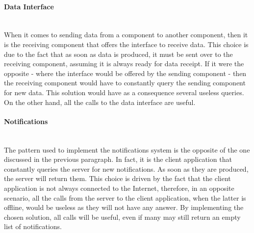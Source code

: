 \documentclass[../../DD.tex]{subfiles}
\begin{document}
	\paragraph{Data Interface}\mbox{}\\
	When it comes to sending data from a component to another component, then it is the receiving component that offers the interface to receive data. This choice is due to the fact that as soon as data is produced, it must be sent over to the receiving component, assuming it is always ready for data receipt. If it were the opposite - where the interface would be offered by the sending component - then the receiving component would have to constantly query the sending component for new data. This solution would have as a consequence several useless queries. On the other hand, all the calls to the data interface are useful.

	\paragraph{Notifications}\mbox{}\\
	The pattern used to implement the notifications system is the opposite of the one discussed in the previous paragraph. In fact, it is the client application that constantly queries the server for new notifications. As soon as they are produced, the server will return them. This choice is driven by the fact that the client application is not always connected to the Internet, therefore, in an opposite scenario, all the calls from the server to the client application, when the latter is offline, would be useless as they will not have any answer. By implementing the chosen solution, all calls will be useful, even if many may still return an empty list of notifications.
\end{document}
